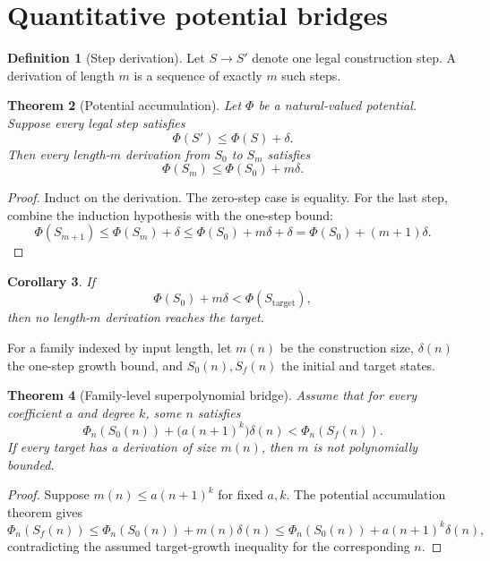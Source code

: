 \documentclass[11pt]{article}
\newtheorem{theorem}{Theorem}[section]
\newtheorem{corollary}[theorem]{Corollary}
\theoremstyle{definition}
\newtheorem{definition}[theorem]{Definition}
\begin{document}
\section{Quantitative potential bridges}

\begin{definition}[Step derivation]
Let \(S\to S'\) denote one legal construction step.  A derivation of length
\(m\) is a sequence of exactly \(m\) such steps.
\end{definition}

\begin{theorem}[Potential accumulation]
Let \(\Phi\) be a natural-valued potential.  Suppose every legal step
satisfies
\[
  \Phi(S')\le \Phi(S)+\delta.
\]
Then every length-\(m\) derivation from \(S_0\) to \(S_m\) satisfies
\[
  \Phi(S_m)\le \Phi(S_0)+m\delta.
\]
\end{theorem}

\begin{proof}
Induct on the derivation.  The zero-step case is equality.  For the last
step, combine the induction hypothesis with the one-step bound:
\[
  \Phi(S_{m+1})
  \le \Phi(S_m)+\delta
  \le \Phi(S_0)+m\delta+\delta
  =\Phi(S_0)+(m+1)\delta.
\]
\end{proof}

\begin{corollary}
If
\[
  \Phi(S_0)+m\delta<\Phi(S_{\mathrm{target}}),
\]
then no length-\(m\) derivation reaches the target.
\end{corollary}

For a family indexed by input length, let \(m(n)\) be the construction size,
\(\delta(n)\) the one-step growth bound, and \(S_0(n),S_f(n)\) the initial
and target states.

\begin{theorem}[Family-level superpolynomial bridge]
Assume that for every coefficient \(a\) and degree \(k\), some \(n\) satisfies
\[
 \Phi_n(S_0(n))+
 \bigl(a(n+1)^k\bigr)\delta(n)
 <
 \Phi_n(S_f(n)).
\]
If every target has a derivation of size \(m(n)\), then \(m\) is not
polynomially bounded.
\end{theorem}

\begin{proof}
Suppose \(m(n)\le a(n+1)^k\) for fixed \(a,k\).  The potential accumulation
theorem gives
\[
 \Phi_n(S_f(n))
 \le \Phi_n(S_0(n))+m(n)\delta(n)
 \le \Phi_n(S_0(n))+a(n+1)^k\delta(n),
\]
contradicting the assumed target-growth inequality for the corresponding
\(n\).
\end{proof}
\end{document}

